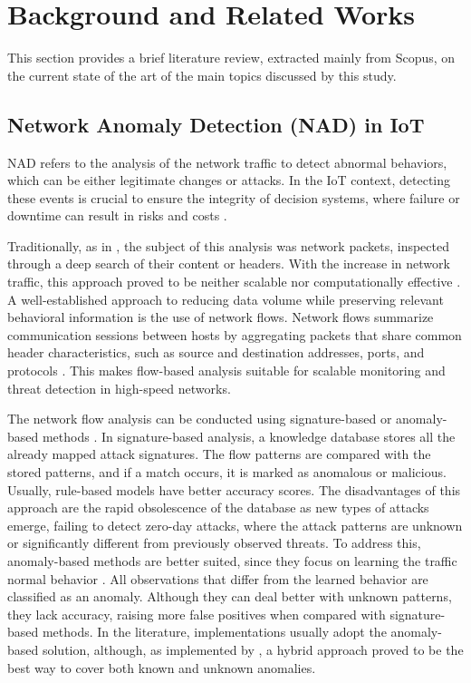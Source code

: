 \section{Background and Related Works} \label{sec:back}
This section provides a brief literature review, extracted mainly from Scopus, on the current state of the art of the main topics discussed by this study.

\subsection{Network Anomaly Detection (NAD) in IoT}

NAD refers to the analysis of the network traffic to detect abnormal behaviors, which can be either legitimate changes or attacks. In the IoT context, detecting these events is crucial to ensure the integrity of decision systems, where failure or downtime can result in risks and costs \cite{liso:2024}. 

Traditionally, as in \cite{ge:2019}, the subject of this analysis was network packets, inspected through a deep search of their content or headers. With the increase in network traffic, this approach proved to be neither scalable nor computationally effective \cite{wang:2025,miguel:2026}. A well-established approach to reducing data volume while preserving relevant behavioral information is the use of network flows. Network flows summarize communication sessions between hosts by aggregating packets that share common header characteristics, such as source and destination addresses, ports, and protocols \cite{miguel:2026}. This makes flow-based analysis suitable for scalable monitoring and threat detection in high-speed networks.

The network flow analysis can be conducted using signature-based or anomaly-based methods \cite{elnakib:2023}. In signature-based analysis, a knowledge database stores all the already mapped attack signatures. The flow patterns are compared with the stored patterns, and if a match occurs, it is marked as anomalous or malicious. Usually, rule-based models have better accuracy scores. The disadvantages of this approach are the rapid obsolescence of the database as new types of attacks emerge, failing to detect zero-day attacks, where the attack patterns are unknown or significantly different from previously observed threats. To address this, anomaly-based methods are better suited, since they focus on learning the traffic normal behavior \cite{anis:2025, elnakib:2023}. All observations that differ from the learned behavior are classified as an anomaly. Although they can deal better with unknown patterns, they lack accuracy, raising more false positives when compared with signature-based methods. In the literature, implementations usually adopt the anomaly-based solution, although, as implemented by \cite{hussain:2024}, a hybrid approach proved to be the best way to cover both known and unknown anomalies.

